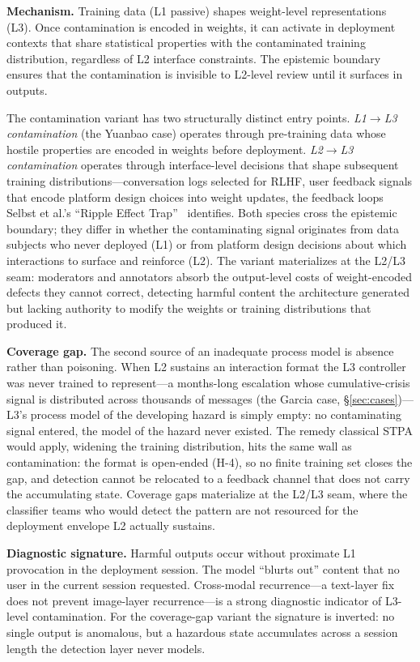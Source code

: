 \textbf{Mechanism.} Training data (L1 passive) shapes weight-level representations (L3). Once contamination is encoded in weights, it can activate in deployment contexts that share statistical properties with the contaminated training distribution, regardless of L2 interface constraints. The epistemic boundary ensures that the contamination is invisible to L2-level review until it surfaces in outputs.

The contamination variant has two structurally distinct entry points. \textit{L1$\to$L3 contamination} (the Yuanbao case) operates through pre-training data whose hostile properties are encoded in weights before deployment. \textit{L2$\to$L3 contamination} operates through interface-level decisions that shape subsequent training distributions---conversation logs selected for RLHF, user feedback signals that encode platform design choices into weight updates, the feedback loops Selbst et al.'s ``Ripple Effect Trap''~\cite{selbst2019fairness} identifies. Both species cross the epistemic boundary; they differ in whether the contaminating signal originates from data subjects who never deployed (L1) or from platform design decisions about which interactions to surface and reinforce (L2). The variant materializes at the L2/L3 seam: moderators and annotators absorb the output-level costs of weight-encoded defects they cannot correct, detecting harmful content the architecture generated but lacking authority to modify the weights or training distributions that produced it.

\textbf{Coverage gap.} The second source of an inadequate process model is absence rather than poisoning. When L2 sustains an interaction format the L3 controller was never trained to represent---a months-long escalation whose cumulative-crisis signal is distributed across thousands of messages (the Garcia case, \S\ref{sec:cases})---L3's process model of the developing hazard is simply empty: no contaminating signal entered, the model of the hazard never existed. The remedy classical STPA would apply, widening the training distribution, hits the same wall as contamination: the format is open-ended (H-4), so no finite training set closes the gap, and detection cannot be relocated to a feedback channel that does not carry the accumulating state. Coverage gaps materialize at the L2/L3 seam, where the classifier teams who would detect the pattern are not resourced for the deployment envelope L2 actually sustains.

\textbf{Diagnostic signature.} Harmful outputs occur without proximate L1 provocation in the deployment session. The model ``blurts out'' content that no user in the current session requested. Cross-modal recurrence---a text-layer fix does not prevent image-layer recurrence---is a strong diagnostic indicator of L3-level contamination. For the coverage-gap variant the signature is inverted: no single output is anomalous, but a hazardous state accumulates across a session length the detection layer never models.

